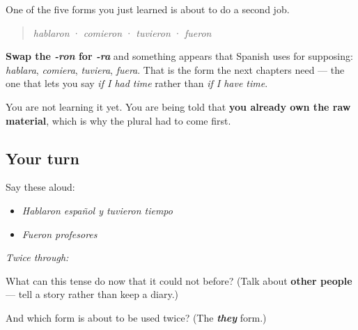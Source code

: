 \begin{grammarlens}[title={Grammar Lens: the form that pays twice}]
One of the five forms you just learned is about to do a second job.

\begin{quote}
\emph{hablaron} · \emph{comieron} · \emph{tuvieron} · \emph{fueron}
\end{quote}

\textbf{Swap the \emph{-ron} for \emph{-ra}} and something appears that Spanish uses for supposing: \emph{hablara}, \emph{comiera}, \emph{tuviera}, \emph{fuera}. That is the form the next chapters need — the one that lets you say \emph{if I had time} rather than \emph{if I have time}.

You are not learning it yet. You are being told that \textbf{you already own the raw material}, which is why the plural had to come first.
\end{grammarlens}

\subsection*{Your turn}
Say these aloud:

\begin{itemize}
\raggedright
  \item \emph{Hablaron español y tuvieron tiempo}
  \item \emph{Fueron profesores}
\end{itemize}

\emph{Twice through:}

\begin{tcolorbox}[breakable,colback=teal!4,colframe=teal!35!black,title={Before you move on}]
What can this tense do now that it could not before? (Talk about \textbf{other people} — tell a story rather than keep a diary.)

And which form is about to be used twice? (The \emph{\textbf{they}} form.)
\end{tcolorbox}
